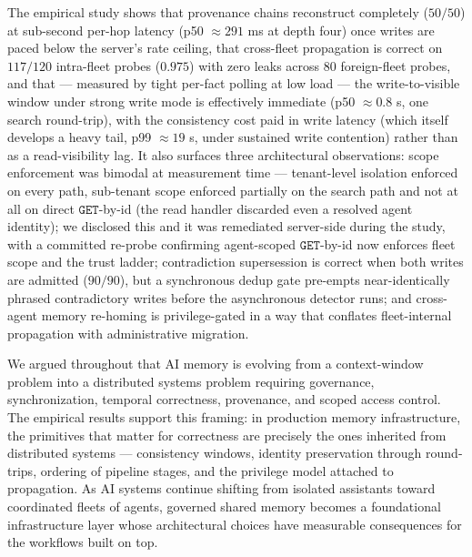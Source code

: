 \documentclass[10pt,twocolumn,letterpaper]{article}
\begin{document}
The empirical study shows that provenance chains reconstruct completely (\(50/50\)) at sub-second per-hop latency (p50 \(\approx 291\) ms at depth four) once writes are paced below the server's rate ceiling, that cross-fleet propagation is correct on \(117/120\) intra-fleet probes (\(0.975\)) with zero leaks across \(80\) foreign-fleet probes, and that --- measured by tight per-fact polling at low load --- the write-to-visible window under strong write mode is effectively immediate (p50 \(\approx 0.8\) s, one search round-trip), with the consistency cost paid in write latency (which itself develops a heavy tail, p99 \(\approx 19\) s, under sustained write contention) rather than as a read-visibility lag. It also surfaces three architectural observations: scope enforcement was bimodal at measurement time --- tenant-level isolation enforced on every path, sub-tenant scope enforced partially on the search path and not at all on direct \(\mathtt{GET}\)-by-id (the read handler discarded even a resolved agent identity); we disclosed this and it was remediated server-side during the study, with a committed re-probe confirming agent-scoped \(\mathtt{GET}\)-by-id now enforces fleet scope and the trust ladder; contradiction supersession is correct when both writes are admitted (\(90/90\)), but a synchronous dedup gate pre-empts near-identically phrased contradictory writes before the asynchronous detector runs; and cross-agent memory re-homing is privilege-gated in a way that conflates fleet-internal propagation with administrative migration.

We argued throughout that AI memory is evolving from a context-window problem into a distributed systems problem requiring governance, synchronization, temporal correctness, provenance, and scoped access control. The empirical results support this framing: in production memory infrastructure, the primitives that matter for correctness are precisely the ones inherited from distributed systems --- consistency windows, identity preservation through round-trips, ordering of pipeline stages, and the privilege model attached to propagation. As AI systems continue shifting from isolated assistants toward coordinated fleets of agents, governed shared memory becomes a foundational infrastructure layer whose architectural choices have measurable consequences for the workflows built on top.



\end{document}
